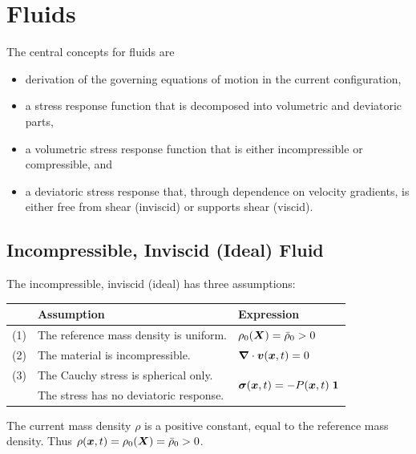 \chapter{Fluids}

The central concepts for fluids are 
\begin{itemize}[noitemsep]
\item derivation of the governing equations of motion 
in the current configuration,
\item a stress response function 
that is decomposed into volumetric and
deviatoric parts,
\item a volumetric stress response function 
that is either incompressible
or compressible, and 
\item a deviatoric stress response that, 
through dependence on velocity gradients, 
is either free from shear (inviscid) or 
supports shear (viscid).
\end{itemize}

\section{Incompressible, Inviscid (Ideal) Fluid}
The incompressible, inviscid (ideal) has three
assumptions:
\be
\begin{tabular}{cl|l}
 &
 {\bf Assumption} 
 & 
 {\bf Expression}  \\ \hline \hline
 (1) 
 & 
 The reference mass density is uniform. 
 & 
 $\rho_0(\vX) = \bar\rho_0 > 0$ 
 \\ \hline
 (2) 
 &
 The material is incompressible.
 & 
 $\grad \cdot \vv(\vx, t) = 0$
 \\ \hline
 (3)
 &
 The Cauchy stress is spherical only.
 & 
 \multirow{ 2}{*}{$\vsigma(\vx, t) = - P(\vx, t) \; \vid$} \\
 
 &
 The stress has no deviatoric response.
 & 
\end{tabular}
\label{eq:incompressible_inviscid}
\ee

\begin{Hresult}
The current mass density $\rho$ is a positive constant, equal to the
reference mass density.  
Thus $\rho(\mbox{\boldmath $x$}, t) = \rho_0(\mbox{\boldmath $X$}) = \bar\rho_0 > 0$.
\end{Hresult}

